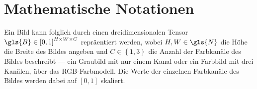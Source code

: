 \section{Mathematische Notationen}
\label{mathematische_notationen}



Ein Bild kann folglich durch einen dreidimensionalen Tensor $\gls{B} \in {\left[0, 1\right]}^{H \times W \times C}$ repräentiert werden, wobei $H, W \in \gls{N}$ die Höhe \bzw{} die Breite des Bildes angeben und $C \in \left\{1, 3\right\}$ die Anzahl der Farbkanäle des Bildes beschreibt — ein Graubild mit nur einem Kanal oder ein Farbbild mit drei Kanälen, \zB{} über das RGB-Farbmodell.
Die Werte der einzelnen Farbkanäle des Bildes werden dabei auf $\left[0, 1\right]$ skaliert.
